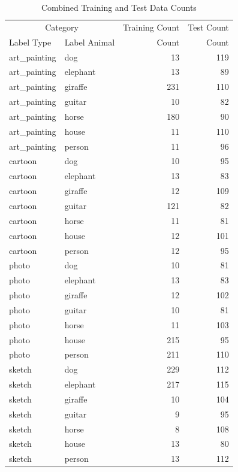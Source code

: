 \documentclass{article}
\begin{document}
\begin{table}[ht]
    \centering
    \caption{Combined Training and Test Data Counts}
    \label{tab:dataset_distribution}
    \begin{tabular}{llrr}
        \toprule
        \multicolumn{2}{c}{Category} & \multicolumn{1}{c}{Training Count} & \multicolumn{1}{c}{Test Count} \\
        \cmidrule(lr){1-2} \cmidrule(lr){3-3} \cmidrule(lr){4-4}
        Label Type & Label Animal & Count & Count \\
        \midrule
        art\_painting & dog & 13 & 119 \\
        art\_painting & elephant & 13 & 89 \\
        art\_painting & giraffe & 231 & 110 \\
        art\_painting & guitar & 10 & 82 \\
        art\_painting & horse & 180 & 90 \\
        art\_painting & house & 11 & 110 \\
        art\_painting & person & 11 & 96 \\
        cartoon & dog & 10 & 95 \\
        cartoon & elephant & 13 & 83 \\
        cartoon & giraffe & 12 & 109 \\
        cartoon & guitar & 121 & 82 \\
        cartoon & horse & 11 & 81 \\
        cartoon & house & 12 & 101 \\
        cartoon & person & 12 & 95 \\
        photo & dog & 10 & 81 \\
        photo & elephant & 13 & 83 \\
        photo & giraffe & 12 & 102 \\
        photo & guitar & 10 & 81 \\
        photo & horse & 11 & 103 \\
        photo & house & 215 & 95 \\
        photo & person & 211 & 110 \\
        sketch & dog & 229 & 112 \\
        sketch & elephant & 217 & 115 \\
        sketch & giraffe & 10 & 104 \\
        sketch & guitar & 9 & 95 \\
        sketch & horse & 8 & 108 \\
        sketch & house & 13 & 80 \\
        sketch & person & 13 & 112 \\
        \bottomrule
    \end{tabular}
    \end{table}
\end{document}

